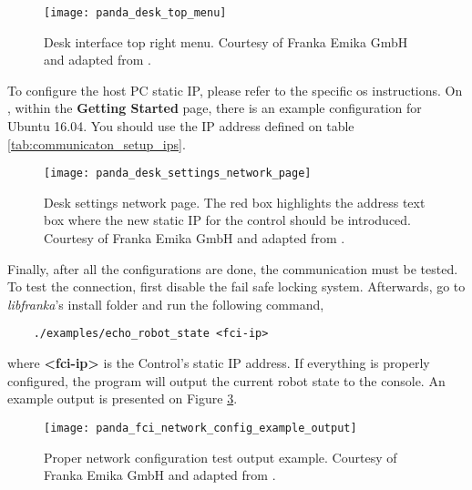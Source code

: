 \begin{figure}[htbp]
    \centering
	\texttt{[image: panda\_desk\_top\_menu]}
	\caption[Desk interface top right menu.]{Desk interface top right menu. Courtesy of Franka Emika GmbH and adapted from \cite{FrankaEmikaGmbH_fci_documentation}.}
	\label{fig:panda_desk_top_menu}
\end{figure}

To configure the host PC static IP, please refer to the specific \gls{os} instructions. On \cite{FrankaEmikaGmbH_fci_documentation}, within the \textbf{Getting Started} page, there is an example configuration for Ubuntu 16.04. You should use the IP address defined on table \ref{tab:communicaton_setup_ips}.\\

\begin{figure}[htbp]
    \centering
	\texttt{[image: panda\_desk\_settings\_network\_page]}
	\caption[Desk settings network page.]{Desk settings network page. The red box highlights the address text box where the new static IP for the control should be introduced. Courtesy of Franka Emika GmbH and adapted from \cite{FrankaEmikaGmbH_fci_documentation}.}
	\label{fig:panda_desk_settings_network_page}
\end{figure}

Finally, after all the configurations are done, the communication must be tested. To test the connection, first disable the fail safe locking system. Afterwards, go to \textit{libfranka}'s install folder and run the following command,

\begin{verbatim}
    ./examples/echo_robot_state <fci-ip>
\end{verbatim}

where \textbf{<fci-ip>} is the Control's static IP address. If everything is properly configured, the program will output the current robot state to the console. An example output is presented on Figure \ref{fig:panda_fci_network_config_example_output}.\\

\begin{figure}[htbp]
    \centering
	\texttt{[image: panda\_fci\_network\_config\_example\_output]}
	\caption[Desk settings network page.]{Proper network configuration test output example. Courtesy of Franka Emika GmbH and adapted from \cite{FrankaEmikaGmbH_fci_documentation}.}
	\label{fig:panda_fci_network_config_example_output}
\end{figure}

